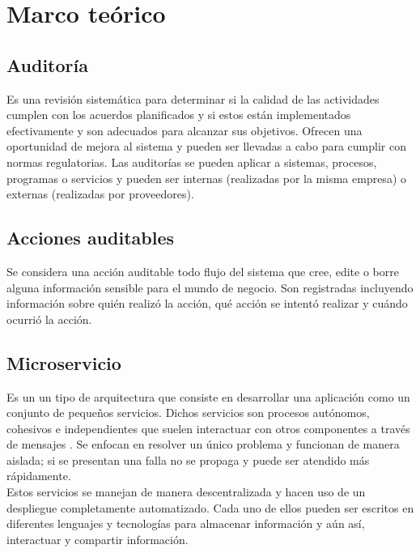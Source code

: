 \chapter{\textbf{Marco teórico}}

\thispagestyle{empty}

\section{Auditoría}

Es una revisión sistemática para determinar si la calidad de las actividades cumplen con los acuerdos planificados y si estos están implementados efectivamente y son adecuados para alcanzar sus objetivos. Ofrecen una oportunidad de mejora al sistema y pueden ser llevadas a cabo para cumplir con normas regulatorias. Las auditorías se pueden aplicar a sistemas, procesos, programas o servicios y pueden ser internas (realizadas por la misma empresa) o externas (realizadas por proveedores). \cite{weinstein1997total}

\section{Acciones auditables}

Se considera una acción auditable todo flujo del sistema que cree, edite o borre alguna información sensible para el mundo de negocio. Son registradas incluyendo información sobre quién realizó la acción, qué acción se intentó realizar y cuándo ocurrió la acción.

\section{Microservicio}

Es un un tipo de arquitectura que consiste en desarrollar una aplicación como un conjunto de pequeños servicios. Dichos servicios son procesos autónomos, cohesivos e independientes que suelen interactuar con otros componentes a través de mensajes \cite{Microservices1}. Se enfocan en resolver un único problema y funcionan de manera aislada; si se presentan una falla no se propaga y puede ser atendido más rápidamente. \cite{Microservices2} \\

Estos servicios se manejan de manera descentralizada y hacen uso de un despliegue completamente automatizado. Cada uno de ellos pueden ser escritos en diferentes lenguajes y tecnologías para almacenar información y aún así, interactuar y compartir información. \cite{Microservices2}

